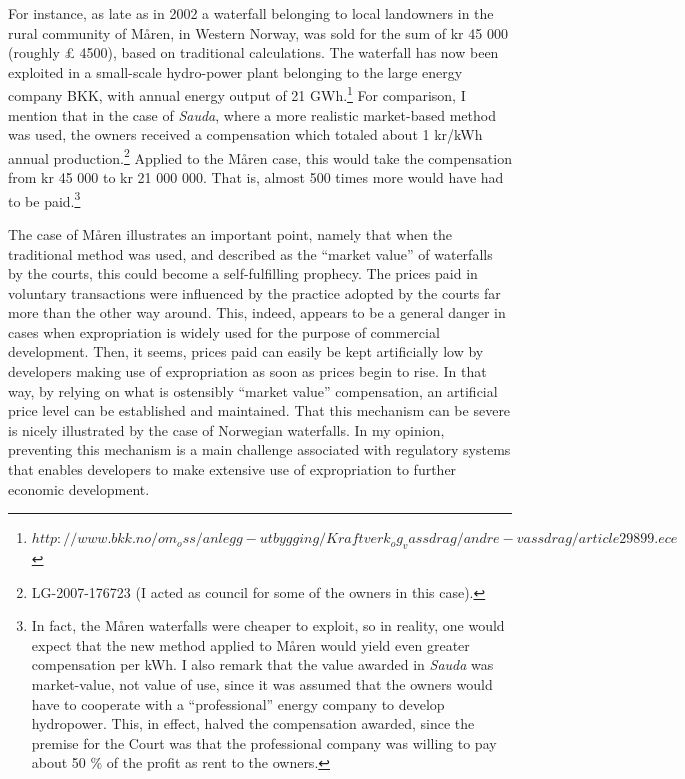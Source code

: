 For instance, as late as in 2002 a waterfall belonging to local landowners in the rural community of Måren, in Western Norway, was sold for the sum of kr 45 000 (roughly £ 4500), based on traditional calculations. The waterfall has now been exploited in a small-scale hydro-power plant belonging to the large energy company BKK, with annual energy output of 21 GWh.\footnote{$http://www.bkk.no/om_oss/anlegg-utbygging/Kraftverk_og_vassdrag/andre-vassdrag/article29899.ece$} For comparison, I mention that in the case of \emph{Sauda}, where a more realistic market-based method was used, the owners received a compensation which totaled about 1 kr/kWh annual production.\footnote{LG-2007-176723 (I acted as council for some of the owners in this case).} Applied to the Måren case, this would take the compensation from kr 45 000 to kr 21 000 000. That is, almost 500 times more would have had to be paid.\footnote{In fact, the Måren waterfalls were cheaper to exploit, so in reality, one would expect that the new method applied to Måren would yield even greater compensation per kWh. I also remark that the value awarded in \emph{Sauda} was market-value, not value of use, since it was assumed that the owners would have to cooperate with a ``professional'' energy company to develop hydropower. This, in effect, halved the compensation awarded, since the premise for the Court was that the professional company was willing to pay about 50 \% of the profit as rent to the owners.}

The case of Måren illustrates an important point, namely that when the traditional method was used, and described as the ``market value'' of waterfalls by the courts, this could become a self-fulfilling prophecy. The prices paid in voluntary transactions were influenced by the practice adopted by the courts far more than the other way around. This, indeed, appears to be a general danger in cases when expropriation is widely used for the purpose of commercial development. Then, it seems, prices paid can easily be kept artificially low by developers making use of expropriation as soon as prices begin to rise. In that way, by relying on what is ostensibly ``market value'' compensation, an artificial price level can be established and maintained. That this mechanism can be severe is nicely illustrated by the case of Norwegian waterfalls. In my opinion, preventing this mechanism is a main challenge associated with regulatory systems that enables developers to make extensive use of expropriation to further economic development.



